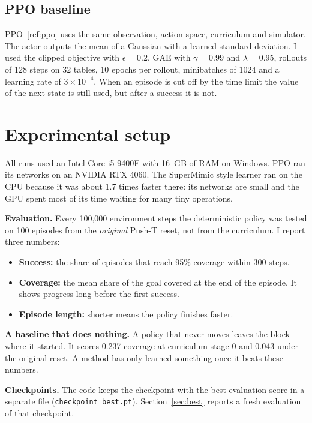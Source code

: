 \documentclass[11pt,a4paper]{article}
\renewcommand{\cite}[1]{\ref{ref:#1}}
\begin{document}
\subsection{PPO baseline}

PPO~\cite{ppo} uses the same observation, action space, curriculum and simulator. The actor outputs
the mean of a Gaussian with a learned standard deviation. I used the clipped objective with
$\epsilon = 0.2$, GAE with $\gamma=0.99$ and $\lambda=0.95$, rollouts of 128 steps on 32 tables,
10 epochs per rollout, minibatches of 1024 and a learning rate of $3\times10^{-4}$. When an
episode is cut off by the time limit the value of the next state is still used, but after a
success it is not.

\section{Experimental setup}
\label{sec:setup}

All runs used an Intel Core i5-9400F with 16~GB of RAM on Windows. PPO ran its networks on an
NVIDIA RTX 4060. The SuperMimic style learner ran on the CPU because it was about 1.7 times faster
there: its networks are small and the GPU spent most of its time waiting for many tiny operations.

\textbf{Evaluation.} Every 100{,}000 environment steps the deterministic policy was tested on 100
episodes from the \emph{original} Push-T reset, not from the curriculum. I report three numbers:
\begin{itemize}
  \item \textbf{Success:} the share of episodes that reach 95\% coverage within 300 steps.
  \item \textbf{Coverage:} the mean share of the goal covered at the end of the episode. It shows
        progress long before the first success.
  \item \textbf{Episode length:} shorter means the policy finishes faster.
\end{itemize}

\textbf{A baseline that does nothing.} A policy that never moves leaves the block where it started.
It scores 0.237 coverage at curriculum stage 0 and 0.043 under the original reset. A method has only
learned something once it beats these numbers.

\textbf{Checkpoints.} The code keeps the checkpoint with the best evaluation score in a separate file
(\texttt{checkpoint\_best.pt}). Section~\ref{sec:best} reports a fresh evaluation of that checkpoint.
\end{document}
